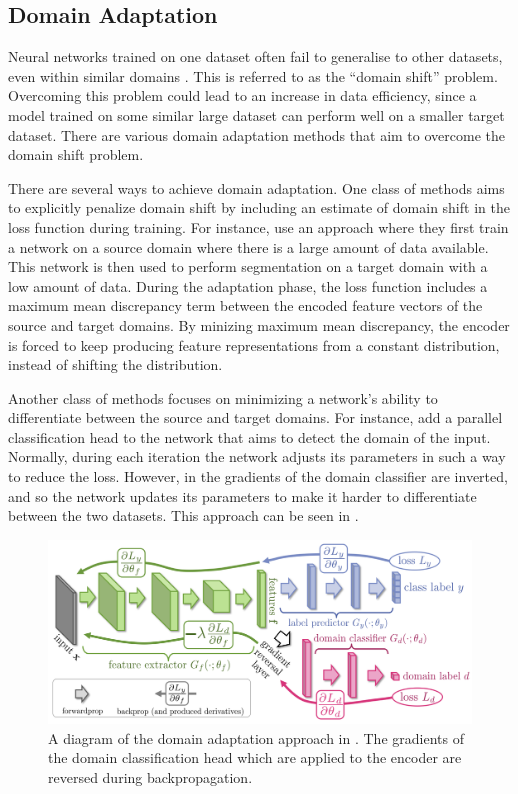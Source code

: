 	\subsection{Domain Adaptation}
	
Neural networks trained on one dataset often fail to generalise to other datasets, even within similar domains \cite{torralbaUnbiasedLookDataset2011}. This is referred to as the ``domain shift'' problem. Overcoming this problem could lead to an increase in data efficiency, since a model trained on some similar large dataset can perform well on a smaller target dataset. There are various domain adaptation methods that aim to overcome the domain shift problem.

There are several ways to achieve domain adaptation. One class of methods aims to explicitly penalize domain shift by including an estimate of domain shift in the loss function during training. For instance, \citet{liuUnsupervisedDeepDomain2018} use an approach where they first train a network on a source domain where there is a large amount of data available. This network is then used to perform segmentation on a target domain with a low amount of data. During the adaptation phase, the loss function includes a maximum mean discrepancy term between the encoded feature vectors of the source and target domains. By minizing maximum mean discrepancy, the encoder is forced to keep producing feature representations from a constant distribution, instead of shifting the distribution.

Another class of methods focuses on minimizing a network's ability to differentiate between the source and target domains. For instance, \citet{ganinDA2015} add a parallel classification head to the network that aims to detect the domain of the input. Normally, during each iteration the network adjusts its parameters in such a way to reduce the loss. However, in \cite{ganinDA2015} the gradients of the domain classifier are inverted, and so the network updates its parameters to make it harder to differentiate between the two datasets. This approach can be seen in .

\begin{figure}[h!]
 \centering
 \includegraphics[width=0.7\linewidth]{images/3/unsup-dom-adpt}
 \caption{A diagram of the domain adaptation approach in \citet{ganinDA2015}. The gradients of the domain classification head which are applied to the encoder are reversed during backpropagation.}
 \label{fig:unsup-dom-adpt}
\end{figure}
	
